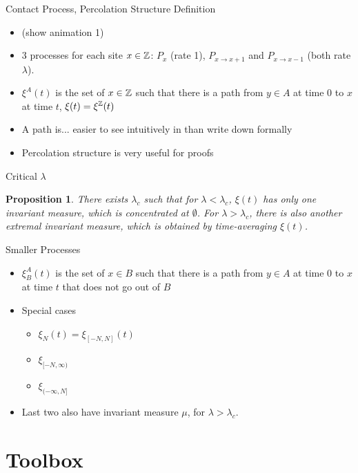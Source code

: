 \documentclass{beamer}
\newtheorem*{proposition}{Proposition}
\newcommand{\ignore}[1]{}
\newcommand{\rb}{\ignore{[}]}
\begin{document}
\begin{frame}{Contact Process, Percolation Structure Definition}
  \begin{itemize}
    \item (show animation 1)
    \pause
    \item 3 processes for each site $x \in \mathbb{Z}$: $P_{x}$ (rate 1), $P_{x \to x+1}$ and $P_{x \to x-1}$ (both rate $\lambda$).
    \pause
    \item $\xi^{A}(t)$ is the set of $x \in \mathbb{Z}$ such that there is a path from $y \in A$ at time $0$ to $x$ at time $t$, $\xi(t) = \xi^{\mathbb{Z}}(t)$
    \pause
    \item A path is... \pause easier to see intuitively in than write down formally
    \pause
    \item Percolation structure is very useful for proofs
  \end{itemize}
\end{frame}

\begin{frame}{Critical $\lambda$}
  \begin{proposition}
    There exists $\lambda_{c}$ such that for $\lambda < \lambda_{c}$, $\xi(t)$ has only one invariant measure, which is concentrated at $\emptyset$. For $\lambda > \lambda_{c}$, there is also another extremal invariant measure, which is obtained by time-averaging $\xi(t)$.
  \end{proposition}
\end{frame}

\begin{frame}{Smaller Processes}
  \begin{itemize}
    \item $\xi_{B}^{A}(t)$ is the set of $x \in B$ such that there is a path from $y \in A$ at time $0$ to $x$ at time $t$ that does not go out of $B$
    \item Special cases
    \begin{itemize}
      \item $\xi_{N}(t) = \xi_{[-N,N]}(t)$
      \item $\xi_{[-N,\infty)}$
      \item $\xi_{(-\infty,N\rb}$
    \end{itemize}
    \item Last two also have invariant measure $\mu$, for $\lambda > \lambda_{c}$.
  \end{itemize}
\end{frame}

\section{Toolbox}
\end{document}
